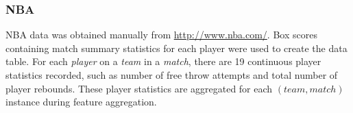 \documentclass[conference]{IEEEtran}
\newcommand{\team}{T}
\newcommand{\player}{P}
\newcommand{\match}{M}
\begin{document}
\subsubsection{NBA}
NBA data was obtained manually from \url{http://www.nba.com/}. Box scores containing match summary statistics for each player were used to create the data table. For each \textit{player} on a \textit{team} in a \textit{match}, there are 19 continuous player statistics recorded, such as number of free throw attempts and total number of player rebounds. These player statistics are aggregated for each $(team,match)$ instance during feature aggregation. %

%
\end{document}
